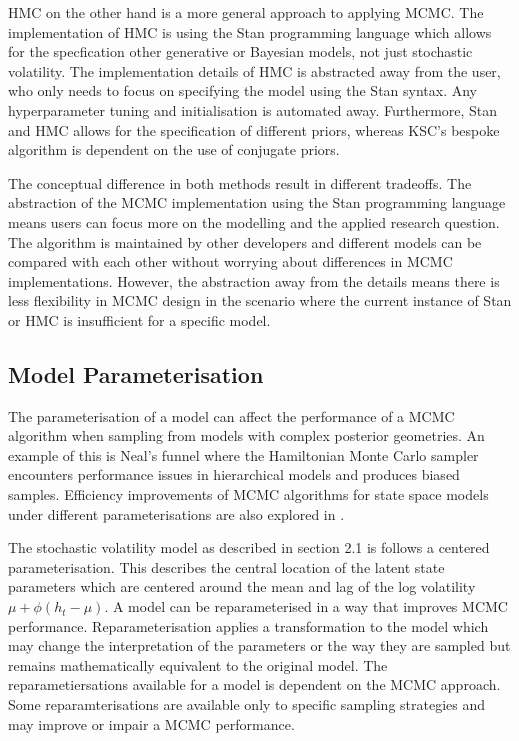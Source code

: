 \documentclass[12pt, a4paper]{article}
\begin{document}
        HMC on the other hand is a more general approach to applying MCMC. The implementation of HMC is using the Stan programming language which allows for the specfication other generative or Bayesian models, not just stochastic volatility. The implementation details of HMC is abstracted away from the user, who only needs to focus on specifying the model using the Stan syntax. Any hyperparameter tuning and initialisation is automated away. Furthermore, Stan and HMC allows for the specification of different priors, whereas KSC's bespoke algorithm is dependent on the use of conjugate priors. 

        The conceptual difference in both methods result in different tradeoffs. The abstraction of the MCMC implementation using the Stan programming language means users can focus more on the modelling and the applied research question. The algorithm is maintained by other developers and different models can be compared with each other without worrying about differences in MCMC implementations. However, the abstraction away from the details means there is less flexibility in MCMC design in the scenario where the current instance of Stan or HMC is insufficient for a specific model.
        
    \subsection{Model Parameterisation}

        The parameterisation of a model can affect the performance of a MCMC algorithm when sampling from models with complex posterior geometries. An example of this is Neal's funnel \citep{neal2003slice} where the Hamiltonian Monte Carlo sampler encounters performance issues in hierarchical models and produces biased samples. Efficiency improvements of MCMC algorithms for state space models under different parameterisations are also explored in \citet{strickland2008parameterisation}.

        The stochastic volatility model as described in section 2.1 is follows a centered parameterisation. This describes the central location of the latent state parameters which are centered around the mean and lag of the log volatility $\mu +\phi(h_t - \mu)$. A model can be reparameterised in a way that improves MCMC performance. Reparameterisation applies a transformation to the model which may change the interpretation of the parameters or the way they are sampled but remains mathematically equivalent to the original model. The reparametiersations available for a model is dependent on the MCMC approach. Some reparamterisations are available only to specific sampling strategies and may improve or impair a MCMC performance. 
\end{document}
